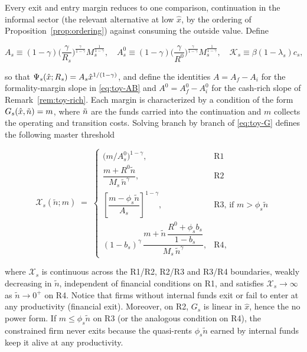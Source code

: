 \documentclass[12pt]{article}
\begin{document}
Every exit and entry margin reduces to one comparison, continuation in the informal sector (the relevant alternative at low $\hat x$, by the ordering of Proposition~\ref{prop:ordering}) against consuming the outside value. Define

\begin{equation}
  A_{s}\equiv(1-\gamma)\Big(\frac{\gamma}{R_{s}}\Big)^{\frac{\gamma}{1-\gamma}}
  M_{s}^{\frac{1}{1-\gamma}},\quad
  A^{0}_{s}\equiv(1-\gamma)\Big(\frac{\gamma}{R^0}\Big)^{\frac{\gamma}{1-\gamma}}
  M_{s}^{\frac{1}{1-\gamma}},\quad
  \mathcal{K}_{s}\equiv\beta(1-\lambda_{s})c_{s},
  \label{eq:toy-Anot}
\end{equation}

so that $\Psi_{s}(\hat{x};R_{s})=A_{s}\hat{x}^{1/(1-\gamma)}$, and define the identities $A=A_{f}-A_{i}$ for the formality-margin slope in \eqref{eq:toy-AB} and $A^{0}=A^{0}_{f}-A^{0}_{i}$ for the cash-rich slope of Remark~\ref{rem:toy-rich}. Each margin is characterized by a condition of the form $G_{s}(\hat{x},\tilde{n})=m$, where $\tilde{n}$ are the funds carried into the continuation and $m$ collects the operating and transition costs. Solving branch by branch of \eqref{eq:toy-G} defines the following master threshold

\begin{equation}
  \mathcal{X}_{s}(\tilde n;m)\;=\;
  \begin{cases}
    \big(m/A^{0}_{s}\big)^{1-\gamma},
      & \text{R1}\\[4pt]
    \dfrac{m+R^0\tilde n}{M_{s}\,\tilde n^{\gamma}},
      & \text{R2}\\[8pt]
    \left[\dfrac{m-\phi_{s}\tilde n}{A_{s}}\right]^{1-\gamma},
      & \text{R3, if } m>\phi_{s}\tilde n\\[8pt]
    (1-b_{s})^{\gamma}\,
    \dfrac{m+\tilde n\,\dfrac{R^0+\phi_{s}b_{s}}
    {1-b_{s}}}{M_{s}\,\tilde n^{\gamma}},
      & \text{R4},
  \end{cases}
  \label{eq:toy-master}
\end{equation}

where $\mathcal{X}_{s}$ is continuous across the R1/R2, R2/R3 and R3/R4 boundaries, weakly decreasing in $\tilde n$, independent of financial conditions on R1, and satisfies $\mathcal{X}_{s}\to\infty$ as $\tilde n\to0^{+}$ on R4. Notice that firms without internal funds exit or fail to enter at any productivity (financial exit). Moreover, on R2, $G_{s}$ is linear in $\hat x$, hence the no power form. If $m\leq\phi_{s}\tilde n$ on R3 (or the analogous condition on R4), the constrained firm never exits because the quasi-rents $\phi_ {s}\tilde n$ earned by internal funds keep it alive at any productivity.
 
\end{document}
